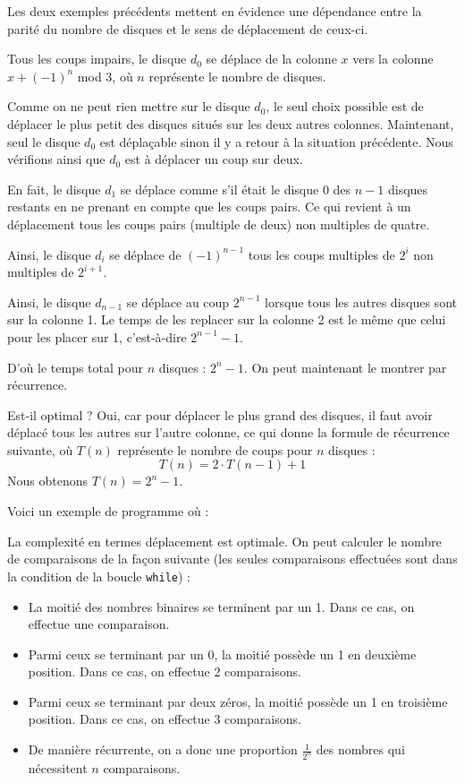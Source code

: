 \Q
Les deux exemples précédents mettent en évidence une dépendance entre la parité du nombre de disques et le sens de déplacement de ceux-ci.
\medskip

Tous les coups impairs, le disque $d_0$ se déplace de la colonne $x$ vers la colonne $x+(-1)^n$ mod 3, où $n$ représente le nombre de disques.
\medskip

Comme on ne peut rien mettre sur le disque $d_0$, le seul choix possible est de déplacer le plus petit des disques situés sur les deux autres colonnes. Maintenant, seul le disque $d_0$ est déplaçable sinon il y a retour à la situation précédente. Nous vérifions ainsi que $d_0$ est à déplacer un coup sur deux.

\Q
En fait, le disque $d_1$ se déplace comme s'il était le disque 0 des $n-1$ disques restants en ne prenant en compte que les coups pairs. Ce qui revient à un déplacement tous les coups pairs (multiple de deux) non multiples de quatre.
\medskip

Ainsi, le disque $d_i$ se déplace de $(-1)^{n-1}$ tous les coups multiples de $2^i$ non multiples de $2^{i+1}$.
\medskip

Ainsi, le disque $d_{n-1}$ se déplace au coup $2^{n-1}$ lorsque tous les autres disques sont sur la colonne 1. Le temps de les replacer sur la colonne 2 est le même que celui pour les placer sur 1, c'est-à-dire $2^{n-1}-1$.
\medskip

D'où le temps total pour $n$ disques : $2^n-1$. On peut maintenant le montrer par récurrence.
\medskip

Est-il optimal ? Oui, car pour déplacer le plus grand des disques, il faut avoir déplacé tous les autres sur l'autre colonne, ce qui donne la formule de récurrence suivante, où $T(n)$ représente le nombre de coups pour $n$ disques :
\[
    T(n) = 2\cdot T(n-1)+1
\]
Nous obtenons $T(n)=2^n-1$.
\medskip

Voici un exemple de programme où :



La complexité en termes déplacement est optimale. On peut calculer le nombre de comparaisons de la façon suivante (les seules comparaisons effectuées sont dans la condition de la boucle \texttt{while}) :
\begin{itemize}
    \item La moitié des nombres binaires se terminent par un 1. Dans ce cas, on effectue une comparaison.
    \item Parmi ceux se terminant par un 0, la moitié possède un 1 en deuxième position. Dans ce cas, on effectue 2 comparaisons.
    \item Parmi ceux se terminant par deux zéros, la moitié possède un 1 en troisième position. Dans ce cas, on effectue 3 comparaisons.
    \item De manière récurrente, on a donc une proportion $\frac{1}{2^n}$ des nombres qui nécessitent $n$ comparaisons.
\end{itemize}
\medskip

